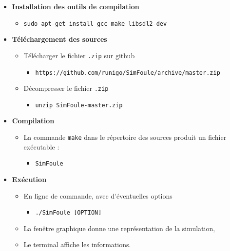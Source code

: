 \begin{itemize}[leftmargin=1cm, label=, itemsep=0pt]
\item {\bf Installation des outils de compilation}
	\begin{itemize}[leftmargin=1cm, label=, itemsep=0pt]
	\item \texttt{sudo apt-get install gcc make libsdl2-dev}
	\end{itemize}
\item {\bf Téléchargement des sources}
	\begin{itemize}[leftmargin=1cm, label=, itemsep=0pt]
	\item Télécharger le fichier \texttt{.zip} sur github
		\begin{itemize}[leftmargin=1cm, label=, itemsep=0pt]
		\item \texttt{https://github.com/runigo/SimFoule/archive/master.zip}
		\end{itemize}
	\item Décompresser le fichier \texttt{.zip}
		\begin{itemize}[leftmargin=1cm, label=, itemsep=0pt]
		\item \texttt{unzip SimFoule-master.zip}
		\end{itemize}
	\end{itemize}
\item {\bf Compilation}
	\begin{itemize}[leftmargin=1cm, label=, itemsep=0pt]
	\item La commande \texttt{make} dans le répertoire des sources produit un fichier exécutable :
		\begin{itemize}[leftmargin=1cm, label=, itemsep=0pt]
		\item \texttt{SimFoule}
		\end{itemize}
	\end{itemize}

\item {\bf Exécution}
	\begin{itemize}[leftmargin=1cm, label=, itemsep=0pt]
	\item En ligne de commande, avec d'éventuelles options
		\begin{itemize}[leftmargin=1cm, label=, itemsep=0pt]
		\item \texttt{./SimFoule [OPTION]}
		\end{itemize}
	\item La fenêtre graphique donne une représentation de la simulation,
	\item Le terminal affiche les informations.
	\end{itemize}
\end{itemize}




